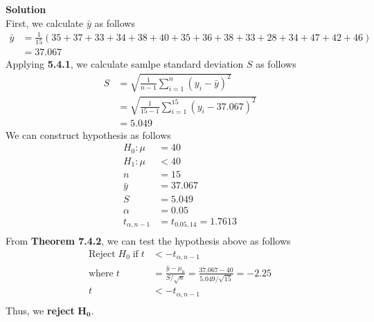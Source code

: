\documentclass{uofa-eng-assignment}
\begin{document}
\begin{enumerate}
        \textbf{Solution} \\
        First, we calculate $\bar{y}$ as follows
        \begin{align*}
            \bar{y} & = \frac{1}{15}(35 + 37 + 33 + 34 + 38 + 40 + 35 + 36 + 38 + 33 + 28 + 34 + 47 + 42 + 46) \\
                    & = 37.067
        \end{align*}
        Applying \textbf{5.4.1}, we calculate samlpe standard deviation $S$ as follows
        \begin{align*}
            S & = \sqrt{\frac{1}{n-1} \sum_{i=1}^{n} (y_i - \bar{y})^2}  \\
              & = \sqrt{\frac{1}{15-1} \sum_{i=1}^{15} (y_i - 37.067)^2} \\
              & = 5.049
        \end{align*}
        We can construct hypothesis as follows
        \begin{align*}
            H_0\!:\mu       & = 40                    \\
            H_1\!:\mu       & < 40                    \\
            n               & = 15                    \\
            \bar{y}         & = 37.067                \\
            S               & = 5.049                 \\
            \alpha          & = 0.05                  \\
            t_{\alpha, n-1} & = t_{0.05, 14} = 1.7613 \\
        \end{align*}
        From \textbf{Theorem 7.4.2}, we can test the hypothesis above as follows
        \begin{align*}
            \text{Reject}\;H_0\;\text{if}\;t & < -t_{\alpha, n-1}                                                                     \\
            \text{where}\;t                  & = \frac{\bar{y} - \mu_0}{S / \sqrt{n}} = \frac{37.067 - 40}{5.049 / \sqrt{15}} = -2.25 \\
            t                                & < -t_{\alpha, n-1}                                                                     \\
        \end{align*}
        Thus, we \textbf{reject} $\boldsymbol{H_0}$.

\end{enumerate}
\end{document}
